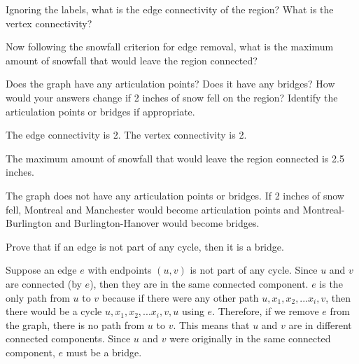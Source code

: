 \documentclass[solution, letterpaper]{cs20}
\begin{document}
\subproblem Ignoring the labels, what is the edge connectivity of the region? What is the vertex connectivity?

\subproblem Now following the snowfall criterion for edge removal, what is the maximum amount of snowfall that would leave the region connected?

\subproblem Does the graph have any articulation points? Does it have any bridges? How would your answers change if 2 inches of snow fell on the region? Identify the articulation points or bridges if appropriate.

\begin{solution}

  \subsolution The edge connectivity is 2. The vertex connectivity is 2.

  \subsolution The maximum amount of snowfall that would leave the region connected is 2.5 inches.

  \subsolution The graph does not have any articulation points or bridges. If 2 inches of snow fell, Montreal and Manchester would become articulation points and Montreal-Burlington and Burlington-Hanover would become bridges.

\end{solution}

Prove that if an edge is not part of any cycle, then it is a bridge.

\begin{solution}

Suppose an edge $e$ with endpoints $(u,v)$ is not part of any cycle. Since $u$ and $v$ are connected (by $e$), then they are in the same connected component. $e$ is the only path from $u$ to $v$ because if there were any other path $u, x_1, x_2, ... x_i, v$, then there would be a cycle $u, x_1, x_2, ... x_i, v, u$ using $e$. Therefore, if we remove $e$ from the graph, there is no path from $u$ to $v$. This means that $u$ and $v$ are in different connected components. Since $u$ and $v$ were originally in the same connected component, $e$ must be a bridge.

\end{solution}
\end{document}
